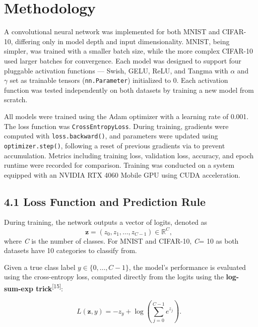 \documentclass{article}
\begin{document}
\section{Methodology}


A convolutional neural network was implemented for both MNIST and CIFAR-10, differing only in model depth and input dimensionality. MNIST, being simpler, was trained with a smaller batch size, while the more complex CIFAR-10 used larger batches for convergence. Each model was designed to support four pluggable activation functions --- Swish, GELU, ReLU, and Tangma with $\alpha$ and $\gamma$ set as trainable tensors (\texttt{nn.Parameter}) initialized to \(0\). Each activation function was tested independently on both datasets by training a new model from scratch. 


\vspace{4pt}

\noindent
All models were trained using the Adam optimizer with a learning rate of 0.001. The loss function was \texttt{CrossEntropyLoss}. During training, gradients were computed with \texttt{loss.backward()}, and parameters were updated using \texttt{optimizer.step()}, following a reset of previous gradients via \texttt{} to prevent accumulation. Metrics including training loss, validation loss, accuracy, and epoch runtime were recorded for comparison. Training was conducted on a system equipped with an NVIDIA RTX 4060 Mobile GPU using CUDA acceleration.

\vspace{4pt}

\subsection*{4.1 Loss Function and Prediction Rule}
During training, the network outputs a vector of logits, denoted as \[
\mathbf{z} = (z_0, z_1, \ldots, z_{C-1}) \in \mathbb{R}^C,
\] where \textit{C} is the number of classes. For MNIST and CIFAR-10, \textit{C}= 10 as both datasets have 10 categories to classify from.

\vspace{4pt}
\noindent
Given a true class label \( y \in \{0, \ldots, C - 1\} \), the model’s performance is evaluated using the cross-entropy loss, computed directly from the logits using the \textbf{log-sum-exp trick}\textsuperscript{[15]}:

\[
L(\mathbf{}{\textbf{z}}, y) = -z_y + \log\left( \sum_{j=0}^{C-1} e^{z_j} \right).
\] 
\end{document}
